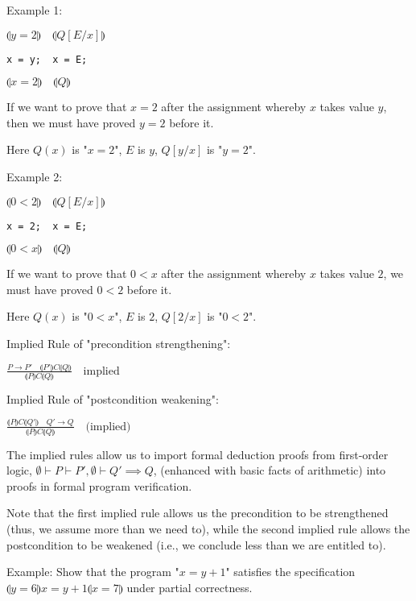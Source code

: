 \documentclass{article}
\begin{document}
Example 1:

$\llparenthesis y = 2 \rrparenthesis \quad \llparenthesis Q[E/x] \rrparenthesis$
\begin{verbatim}
x = y;  x = E;
\end{verbatim}
$\llparenthesis x = 2 \rrparenthesis \quad \llparenthesis Q \rrparenthesis$

If we want to prove that $x = 2$ after the assignment whereby $x$ takes value $y$, then we must have proved $y = 2$ before it.

Here $Q(x)$ is "$x = 2$", $E$ is $y$, $Q[y/x]$ is "$y = 2$".

Example 2:

$\llparenthesis 0 < 2 \rrparenthesis \quad \llparenthesis Q[E/x] \rrparenthesis$
\begin{verbatim}
x = 2;  x = E;
\end{verbatim}
$\llparenthesis 0 < x \rrparenthesis \quad \llparenthesis Q \rrparenthesis$

If we want to prove that $0 < x$ after the assignment whereby $x$ takes value $2$, we must have proved $0 < 2$ before it.

Here $Q(x)$ is "$0<x$", $E$ is $2$, $Q[2/x]$ is "$0 < 2$".

Implied Rule of "precondition strengthening":

$\frac{P \rightarrow P' \quad \llparenthesis P ' \rrparenthesis C \llparenthesis Q \rrparenthesis}{\llparenthesis P \rrparenthesis C \llparenthesis Q \rrparenthesis}\quad \text{implied}$ 

Implied Rule of "postcondition weakening":

$\frac{\llparenthesis P \rrparenthesis C \llparenthesis Q' \rrparenthesis \quad Q' \rightarrow Q}{\llparenthesis P \rrparenthesis C \llparenthesis Q \rrparenthesis}\quad \text{(implied)}$

The implied rules allow us to import formal deduction proofs from first-order logic, $\emptyset \vdash P \vdash P', \emptyset \vdash Q' \implies Q$, (enhanced with basic facts of arithmetic) into proofs in formal program verification. 

Note that the first implied rule allows us the precondition to be strengthened (thus, we assume more than we need to), while the second implied rule allows the postcondition to be weakened (i.e., we conclude less than we are entitled to).

Example: Show that the program "$x = y+ 1$" satisfies the specification $\llparenthesis y = 6 \rrparenthesis x = y + 1 \llparenthesis x = 7 \rrparenthesis$ under partial correctness.
\end{document}
